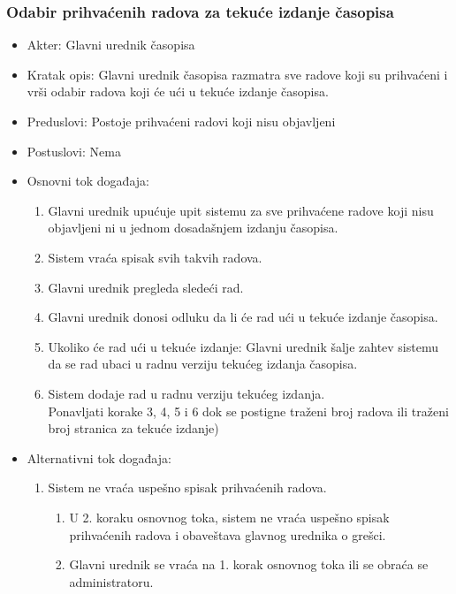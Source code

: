 \documentclass[a4paper]{article}
\begin{document}
\subsubsection{Odabir prihvaćenih radova za tekuće izdanje časopisa}
\label{subsubsection:odabirradova}
\begin{itemize}
    \item Akter: Glavni urednik časopisa
    \item Kratak opis: Glavni urednik časopisa razmatra sve radove koji su prihvaćeni i vrši odabir radova koji će ući u tekuće izdanje časopisa.
    \item Preduslovi: Postoje prihvaćeni radovi koji nisu objavljeni
    \item Postuslovi: Nema
    \item Osnovni tok događaja:
        \begin{enumerate}
            \item Glavni urednik upućuje upit sistemu za sve prihvaćene radove koji nisu objavljeni ni u jednom dosadašnjem izdanju časopisa.
            \item Sistem vraća spisak svih takvih radova.
            \item Glavni urednik pregleda sledeći rad.
            \item Glavni urednik donosi odluku da li će rad ući u tekuće izdanje časopisa.
            \item Ukoliko će rad ući u tekuće izdanje: Glavni urednik šalje zahtev sistemu da se rad ubaci u radnu verziju tekućeg izdanja časopisa.
            \item Sistem dodaje rad u radnu verziju tekućeg izdanja.\\ Ponavljati korake 3, 4, 5 i 6 dok se postigne traženi broj radova ili traženi broj stranica za tekuće izdanje)
        \end{enumerate}
    \item Alternativni tok događaja:
        \begin{enumerate}
            \item Sistem ne vraća uspešno spisak prihvaćenih radova.
                \begin{enumerate}
                    \item U 2. koraku osnovnog toka, sistem ne vraća uspešno spisak prihvaćenih radova i obaveštava glavnog urednika o grešci.
                    \item Glavni urednik se vraća na 1. korak osnovnog toka ili se obraća se administratoru.
                \end{enumerate}

\end{enumerate}
\end{itemize}
\end{document}
